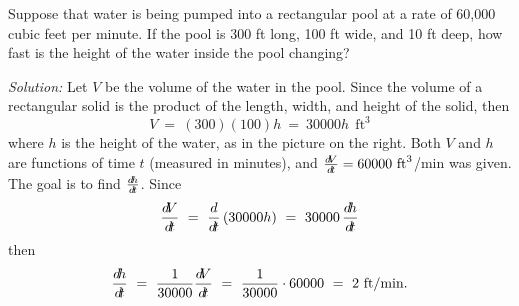 \begin{exmp}\label{exmp:relrate1}
\noindent Suppose that water is being pumped into a rectangular pool at a rate
of 60,000 cubic feet per minute. If the pool is 300 ft long, 100 ft wide, and
10 ft deep, how fast is the height of the water inside the pool changing?\vspace{1mm}
\par\noindent\emph{Solution:} Let $V$ be the volume of the water in the pool.
Since the volume of a rectangular solid is the product of the length, width, and
height of the solid, then
\[
V ~=~ (300)(100)h ~=~ 30000h ~~\text{ft}^3
\]
where $h$ is the height of the water, as in the picture on the right.
Both $V$ and $h$ are functions of time $t$ (measured in minutes), and
$\frac{d\negmedspace V}{d\!t} = 60000~\text{ft}^3$/min was given. The goal is to find
$\frac{d\!h}{d\!t}$. Since
\[
\frac{d\negmedspace V}{d\!t} ~=~ \frac{d}{d\!t}\,(30000h) ~=~ 30000\,\frac{d\!h}{d\!t}
\]
then
\[
\frac{d\!h}{d\!t} ~=~ \frac{1}{30000} \frac{d\negmedspace V}{d\!t} ~=~ \frac{1}{30000}\cdot 60000
~=~ 2~\text{ft/min} .
\]
\end{exmp}
